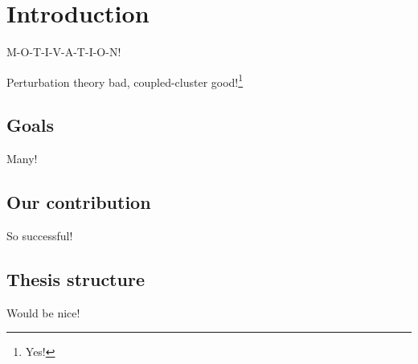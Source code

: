 \chapter{Introduction}
    M-O-T-I-V-A-T-I-O-N!

    Perturbation theory bad, coupled-cluster good!\footnote{Yes!}

    \section{Goals}
        Many!

    \section{Our contribution}
        So successful!

    \section{Thesis structure}
        Would be nice!
